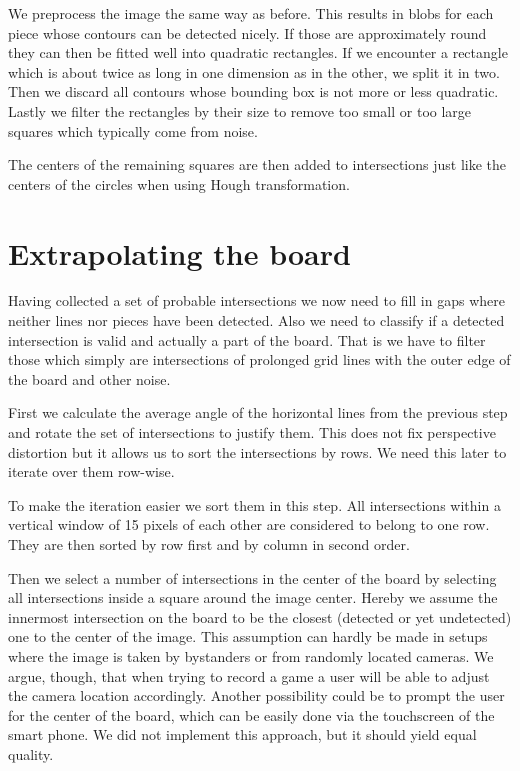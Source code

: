 	We preprocess the image the same way as before. This results in blobs for each piece whose contours can be detected nicely. If those are approximately round they can then be fitted well into quadratic rectangles. If we encounter a rectangle which is about twice as long in one dimension as in the other, we split it in two. Then we discard all contours whose bounding box is not more or less quadratic. Lastly we filter the rectangles by their size to remove too small or too large squares which typically come from noise.

	The centers of the remaining squares are then added to intersections just like the centers of the circles when using Hough transformation.

	\section{Extrapolating the board}
	\label{detector-calculate}
	Having collected a set of probable intersections we now need to fill in gaps where neither lines nor pieces have been detected. Also we need to classify if a detected intersection is valid and actually a part of the board. That is we have to filter those which simply are intersections of prolonged grid lines with the outer edge of the board and other noise.

	First we calculate the average angle of the horizontal lines from the previous step and rotate the set of intersections to justify them. This does not fix perspective distortion but it allows us to sort the intersections by rows. We need this later to iterate over them row-wise.

	To make the iteration easier we sort them in this step. All intersections within a vertical window of 15 pixels of each other are considered to belong to one row. They are then sorted by row first and by column in second order.

	Then we select a number of intersections in the center of the board by selecting all intersections inside a square around the image center. Hereby we assume the innermost intersection on the board to be the closest (detected or yet undetected) one to the center of the image. This assumption can hardly be made in setups where the image is taken by bystanders or from randomly located cameras. We argue, though, that when trying to record a game a user will be able to adjust the camera location accordingly. Another possibility could be to prompt the user for the center of the board, which can be easily done via the touchscreen of the smart phone. We did not implement this approach, but it should yield equal quality.

